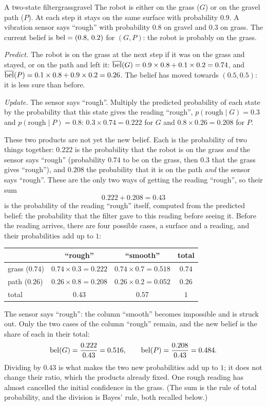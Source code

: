 \begin{example}{A two-state filter}{grassgravel}
The robot is either on the grass ($G$) or on the gravel path ($P$). At
each step it stays on the same surface with probability $0.9$. A vibration
sensor says ``rough'' with probability $0.8$ on gravel and $0.3$ on grass.
The current belief is $\operatorname{bel}=(0.8,\,0.2)$ for $(G,P)$: the robot is
probably on the grass.

\emph{Predict.} The robot is on the grass at the next step if it was on
the grass and stayed, or on the path and left it:
$\overline{\operatorname{bel}}(G)=0.9\times0.8+0.1\times0.2=0.74$, and
$\overline{\operatorname{bel}}(P)=0.1\times0.8+0.9\times0.2=0.26$. The belief has moved towards
$(0.5,0.5)$: it is less sure than before.

\emph{Update.} The sensor says ``rough''. Multiply the predicted
probability of each state by the probability that this state gives the
reading ``rough'', $p(\text{rough}\mid G)=0.3$ and
$p(\text{rough}\mid P)=0.8$: $0.3\times0.74=0.222$ for $G$ and
$0.8\times0.26=0.208$ for $P$.

These two products are not yet the new belief. Each is the probability of
two things together: $0.222$ is the probability that the robot is on the
grass \emph{and} the sensor says ``rough'' (probability $0.74$ to be on
the grass, then $0.3$ that the grass gives ``rough''), and $0.208$ the
probability that it is on the path \emph{and} the sensor says ``rough''.
These are the only two ways of getting the reading ``rough'', so their sum
\[
  0.222+0.208=0.43
\]
is the probability of the reading ``rough'' itself, computed from the
predicted belief: the probability that the filter gave to this reading
before seeing it. Before the reading arrives, there are four possible
cases, a surface and a reading, and their probabilities add up to $1$:
\begin{center}
\begin{tabular}{lccc}
  \toprule
  & ``rough'' & ``smooth'' & total\\
  \midrule
  grass ($0.74$) & $0.74\times0.3=0.222$ & $0.74\times0.7=0.518$ & $0.74$\\
  path ($0.26$)  & $0.26\times0.8=0.208$ & $0.26\times0.2=0.052$ & $0.26$\\
  \midrule
  total & $0.43$ & $0.57$ & $1$\\
  \bottomrule
\end{tabular}
\end{center}
The sensor says ``rough'': the column ``smooth'' becomes impossible and is
struck out. Only the two cases of the column ``rough'' remain, and the new
belief is the share of each in their total:
\[
  \operatorname{bel}(G)=\frac{0.222}{0.43}=0.516,\qquad
  \operatorname{bel}(P)=\frac{0.208}{0.43}=0.484 .
\]
Dividing by $0.43$ is what makes the two new probabilities add up to $1$;
it does not change their ratio, which the products already fixed. One
rough reading has almost cancelled the initial confidence in the grass.
(The sum is the rule of total probability, and the division is Bayes'
rule, both recalled below.)
\end{example}


